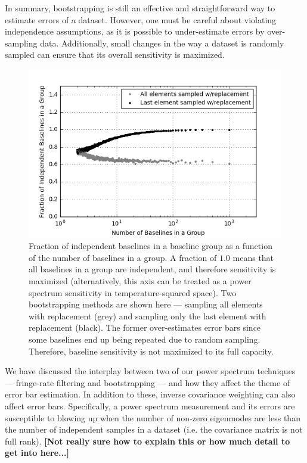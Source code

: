 \documentclass[preprint2,numberedappendix,tighten,twocolappendix]{aastex6}  %
\newcommand{\cc}[1]{{\color{purple} \textbf{[#1]}}}
\begin{document}
In summary, bootstrapping is still an effective and straightforward way to estimate errors of a dataset. However, one must be careful about violating independence assumptions, as it is possible to under-estimate errors by over-sampling data. Additionally, small changes in the way a dataset is randomly sampled can ensure that its overall sensitivity is maximized.

\begin{figure}
	\centering
	\includegraphics[trim={0.3cm 0.3cm 0.3cm 0.3cm},width=\columnwidth]{plots/toy_error2.png}
	\caption{Fraction of independent baselines in a baseline group as a function of the number of baselines in a group. A fraction of $1.0$ means that all baselines in a group are independent, and therefore sensitivity is maximized (alternatively, this axis can be treated as a power spectrum sensitivity in temperature-squared space). Two bootstrapping methods are shown here --- sampling all elements with replacement (grey) and sampling only the last element with replacement (black). The former over-estimates error bars since some baselines end up being repeated due to random sampling. Therefore, baseline sensitivity is not maximized to its full capacity.}
	\label{fig:toy_error2}
\end{figure}

We have discussed the interplay between two of our power spectrum techniques --- fringe-rate filtering and bootstrapping --- and how they affect the theme of error bar estimation. In addition to these, inverse covariance weighting can also affect error bars. Specifically, a power spectrum measurement and its errors are susceptible to blowing up when the number of non-zero eigenmodes are less than the number of independent samples in a dataset (i.e. the covariance matrix is not full rank). \cc{Not really sure how to explain this or how much detail to get into here...}
\end{document}
